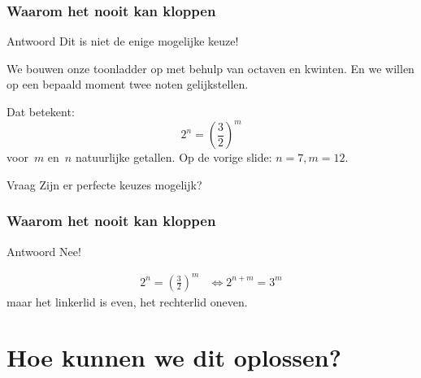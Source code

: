 \documentclass[compress, darktitle, framenumber, totalframenumber]{beamer}
\begin{document}
\begin{frame}
  \frametitle{Waarom het nooit kan kloppen}

  \begin{block}{Antwoord}
    Dit is niet de enige mogelijke keuze!
  \end{block}
  We bouwen onze toonladder op met behulp van octaven en kwinten. En we willen op een bepaald moment twee noten gelijkstellen.

  \pause
  Dat betekent:
  \begin{equation}
    2^n=\left( \frac{3}{2} \right)^m
  \end{equation}
  voor~$m$ en~$n$ natuurlijke getallen. Op de vorige slide: $n=7,m=12$.
  \pause
  \begin{alertblock}{Vraag}
    Zijn er perfecte keuzes mogelijk?
  \end{alertblock}
\end{frame}

\begin{frame}
  \frametitle{Waarom het nooit kan kloppen}

  \begin{block}{Antwoord}
    Nee!
  \end{block}
  \pause
  \begin{equation}
    \begin{aligned}
      2^n=\left( \frac{3}{2} \right)^m&\Longleftrightarrow 2^{n+m}=3^m
    \end{aligned}
  \end{equation}
  maar het linkerlid is even, het rechterlid oneven.
\end{frame}


\section{Hoe kunnen we dit oplossen?}
\end{document}
